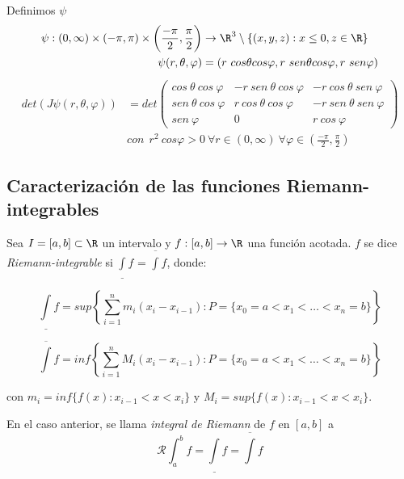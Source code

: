 \begin{ejemplo}
  Definimos $\psi$
\begin{align*}
  \psi : (0, \infty) \times (-\pi, \pi) \times \left( \frac{-\pi}{2},
  \frac{\pi}{2} \right)
&\rightarrow \R^3 \setminus \{(x, y, z) : x \leq 0, z \in \R \} \\
\psi(r, \theta, \varphi) &= (r \ cos \theta cos \varphi, r \ sen \theta cos
                           \varphi, r \ sen \varphi )
\end{align*}
\begin{align*}det(J \psi (r, \theta, \varphi)) &= det
\begin{pmatrix}
  cos \ \theta \ cos \ \varphi & -r \ sen \ \theta \ cos \ \varphi & -r \ cos \ \theta \ sen \ \varphi \\
  sen \ \theta \ cos \ \varphi  & r \ cos \ \theta \ cos \ \varphi & -r \ sen \ \theta \ sen \ \varphi \\
  sen \ \varphi  & 0 & r \
  cos \ \varphi
\end{pmatrix} \\
  &con \ \ r^2 \ cos \varphi > 0 \ \forall r \in (0, \infty) \ \forall \varphi \in \left( \frac{-\pi}{2}, \frac{\pi}{2} \right)
\end{align*}
\end{ejemplo}

\subsection{Caracterización de las funciones Riemann-integrables}
\label{sub:caracterizaci_n_de_las_funciones_riemann_integrables}

\begin{ndef}
    Sea $I = [a, b] \subset \R$ un intervalo y $f : [a, b] \rightarrow \R$ una función acotada. $f$ se dice \textit{Riemann-integrable} si $\underline {\int}f$ = $\overline {\int}f$, donde:

    $$\underline {\int}f = sup \left \{ \sum_{i=1}^{n} m_i(x_i - x_{i-1}) : P = \{ x_0 = a < x_1 < \hdots < x_n = b \} \right \}$$

    $$\overline {\int}f = inf \left \{ \sum_{i=1}^{n} M_i(x_i - x_{i-1}) : P = \{ x_0 = a < x_1 < \hdots < x_n = b \} \right \}$$

    con $m_i = inf \{ f(x) : x_{i-1} < x < x_i \}$ y $M_i = sup \{ f(x) : x_{i-1} < x < x_i \}$.
\end{ndef}

\begin{ndef}
    En el caso anterior, se llama \textit{integral de Riemann} de $f$ en $[a, b]$ a $$ \mathcal R \int_{a}^{b} f = \underline{\int}f = \overline{\int}f$$
\end{ndef}

